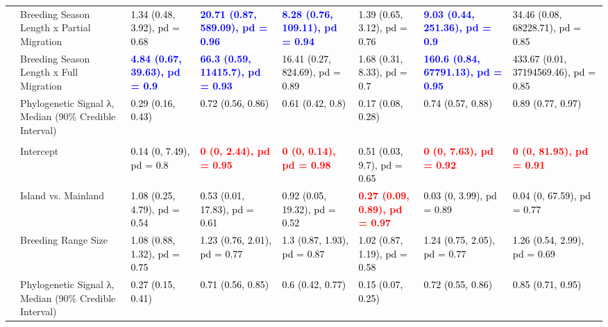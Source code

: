 \documentclass[
  a4paper,
]{article}
\begin{document}
\begin{landscape}
\begin{table}
{\begin{tabular}[t]{llllllll}
 & Breeding Season Length x Partial Migration & \textcolor{black}{1.34 (0.48, 3.92), pd = 0.68} & \textcolor{blue}{\textbf{20.71 (0.87, 589.09), pd = 0.96}} & \textcolor{blue}{\textbf{8.28 (0.76, 109.11), pd = 0.94}} & \textcolor{black}{1.39 (0.65, 3.12), pd = 0.76} & \textcolor{blue}{\textbf{9.03 (0.44, 251.36), pd = 0.9}} & \textcolor{black}{34.46 (0.08, 68228.71), pd = 0.85}\\
 & Breeding Season Length x Full Migration & \textcolor{blue}{\textbf{4.84 (0.67, 39.63), pd = 0.9}} & \textcolor{blue}{\textbf{66.3 (0.59, 11415.7), pd = 0.93}} & \textcolor{black}{16.41 (0.27, 824.69), pd = 0.89} & \textcolor{black}{1.68 (0.31, 8.33), pd = 0.7} & \textcolor{blue}{\textbf{160.6 (0.84, 67791.13), pd = 0.95}} & \textcolor{black}{433.67 (0.01, 37194569.46), pd = 0.85}\\
 & Phylogenetic Signal λ, Median (90\% Credible Interval) & \textcolor{black}{0.29 (0.16, 0.43)} & \textcolor{black}{0.72 (0.56, 0.86)} & \textcolor{black}{0.61 (0.42, 0.8)} & \textcolor{black}{0.17 (0.08, 0.28)} & \textcolor{black}{0.74 (0.57, 0.88)} & \textcolor{black}{0.89 (0.77, 0.97)}\\
\addlinespace[0.3em]
\multicolumn{1}{l}{\textbf{Breeding Spacing}}\\
\hspace{1em} & Intercept & \textcolor{black}{0.14 (0, 7.49), pd = 0.8} & \textcolor{red}{\textbf{0 (0, 2.44), pd = 0.95}} & \textcolor{red}{\textbf{0 (0, 0.14), pd = 0.98}} & \textcolor{black}{0.51 (0.03, 9.7), pd = 0.65} & \textcolor{red}{\textbf{0 (0, 7.63), pd = 0.92}} & \textcolor{red}{\textbf{0 (0, 81.95), pd = 0.91}}\\
\hspace{1em} & Island vs. Mainland & \textcolor{black}{1.08 (0.25, 4.79), pd = 0.54} & \textcolor{black}{0.53 (0.01, 17.83), pd = 0.61} & \textcolor{black}{0.92 (0.05, 19.32), pd = 0.52} & \textcolor{red}{\textbf{0.27 (0.09, 0.89), pd = 0.97}} & \textcolor{black}{0.03 (0, 3.99), pd = 0.89} & \textcolor{black}{0.04 (0, 67.59), pd = 0.77}\\
\hspace{1em} & Breeding Range Size & \textcolor{black}{1.08 (0.88, 1.32), pd = 0.75} & \textcolor{black}{1.23 (0.76, 2.01), pd = 0.77} & \textcolor{black}{1.3 (0.87, 1.93), pd = 0.87} & \textcolor{black}{1.02 (0.87, 1.19), pd = 0.58} & \textcolor{black}{1.24 (0.75, 2.05), pd = 0.77} & \textcolor{black}{1.26 (0.54, 2.99), pd = 0.69}\\
\hspace{1em} & Phylogenetic Signal λ, Median (90\% Credible Interval) & \textcolor{black}{0.27 (0.15, 0.41)} & \textcolor{black}{0.71 (0.56, 0.85)} & \textcolor{black}{0.6 (0.42, 0.77)} & \textcolor{black}{0.15 (0.07, 0.25)} & \textcolor{black}{0.72 (0.55, 0.86)} & \textcolor{black}{0.85 (0.71, 0.95)}\\

\end{tabular}}
\end{table}
\end{landscape}
\end{document}
